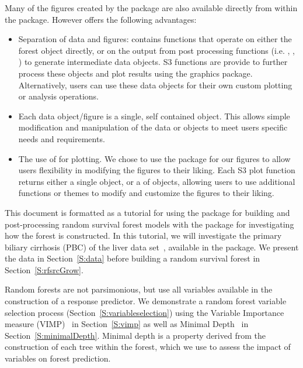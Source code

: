 \documentclass[nojss]{jss}\usepackage[]{graphicx}\usepackage[]{color}
\begin{document}
Many of the figures created by the  package are also available directly from within the  package. However  offers the following advantages:
\begin{itemize}
\item Separation of data and figures:  contains functions that  operate on either the  forest object directly, or on the output from  post processing functions (i.e. , , ) to generate intermediate  data objects. S3 functions are provide to further process these objects and plot results using the  graphics package. Alternatively, users can use these data objects for their own custom plotting or analysis operations.  

\item Each data object/figure is a single, self contained object. This allows simple modification and manipulation of the data or  objects to meet users specific needs and requirements. 

\item The use of  for plotting. We chose to use the  package for our figures to allow users flexibility in modifying the figures to their liking. Each S3 plot function returns either a single  object, or a  of  objects, allowing users to use additional  functions or themes to modify and customize the figures to their liking.  
\end{itemize}

This document is formatted as a tutorial for using the  package for building and post-processing random survival forest models with the  package for investigating how the forest is constructed. In this tutorial, we will investigate the primary biliary cirrhosis (PBC) of the liver data set~\citep{fleming:1991}, available in the  package. We present the data in Section~\ref{S:data} before building a random survival forest in Section~\ref{S:rfsrcGrow}. 

Random forests are not parsimonious, but use all variables available in the construction of a response predictor. We demonstrate a random forest variable selection process (Section~\ref{S:variableselection}) using the Variable Importance measure (VIMP)~\citep{Breiman:2001} in Section~\ref{S:vimp} as well as Minimal Depth~\citep{Ishwaran:2010} in Section~\ref{S:minimalDepth}. Minimal depth is a property derived from the construction of each tree within the forest, which we use to assess the impact of variables on forest prediction. 
\end{document}
